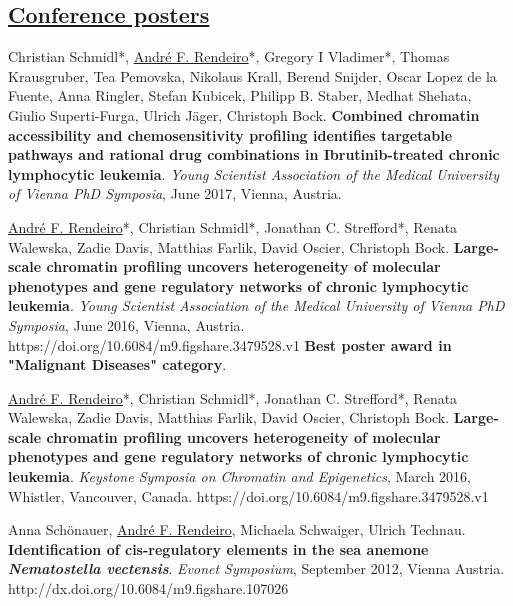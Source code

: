 \documentclass[11pt,a4paper,roman]{moderncv} %
\begin{document}
    \subsection{\underline{Conference posters}}
        \begin{etaremune}[leftmargin=2.5cm,itemindent=0pt,topsep=10pt,itemsep=2pt,partopsep=0pt,parsep=0pt]
        \item Christian Schmidl*, \underline{André F. Rendeiro}*, Gregory I Vladimer*, Thomas Krausgruber, Tea Pemovska, Nikolaus Krall, Berend Snijder, Oscar Lopez de la Fuente, Anna Ringler, Stefan Kubicek, Philipp B. Staber, Medhat Shehata, Giulio Superti-Furga, Ulrich Jäger, Christoph Bock. \textbf{Combined chromatin accessibility and chemosensitivity profiling identifies targetable pathways and rational drug combinations in Ibrutinib-treated chronic lymphocytic leukemia}. \textit{Young Scientist Association of the Medical University of Vienna PhD Symposia}, June 2017, Vienna, Austria.
        \item \underline{André F. Rendeiro}*, Christian Schmidl*, Jonathan C. Strefford*, Renata Walewska, Zadie Davis, Matthias Farlik, David Oscier, Christoph Bock. \textbf{Large-scale chromatin profiling uncovers heterogeneity of molecular phenotypes and gene regulatory networks of chronic lymphocytic leukemia}. \textit{Young Scientist Association of the Medical University of Vienna PhD Symposia}, June 2016, Vienna, Austria. https://doi.org/10.6084/m9.figshare.3479528.v1 \textbf{Best poster award in "Malignant Diseases" category}.
        \item \underline{André F. Rendeiro}*, Christian Schmidl*, Jonathan C. Strefford*, Renata Walewska, Zadie Davis, Matthias Farlik, David Oscier, Christoph Bock. \textbf{Large-scale chromatin profiling uncovers heterogeneity of molecular phenotypes and gene regulatory networks of chronic lymphocytic leukemia}. \textit{Keystone Symposia on Chromatin and Epigenetics}, March 2016, Whistler, Vancouver, Canada. https://doi.org/10.6084/m9.figshare.3479528.v1
        \item Anna Schönauer, \underline{André F. Rendeiro}, Michaela Schwaiger, Ulrich Technau. \textbf{Identification of cis-regulatory elements in the sea anemone \textit{Nematostella vectensis}}. \textit{Evonet Symposium}, September 2012, Vienna Austria. http://dx.doi.org/10.6084/m9.figshare.107026
        \end{etaremune}

\end{document}
